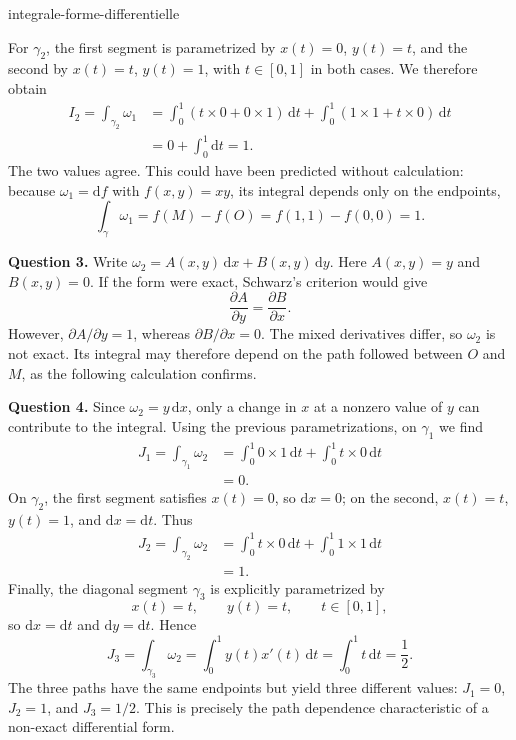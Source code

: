 \begin{exo}{integrale-forme-differentielle}
\begin{solution}
For $\gamma_2$, the first segment is parametrized by $x(t)=0$, $y(t)=t$,
and the second by $x(t)=t$, $y(t)=1$, with $t\in[0,1]$ in both cases.
We therefore obtain
\[
\begin{aligned}
I_2
= \int_{\gamma_2}\omega_1
&= \int_0^1\left(t\times 0+0\times 1\right)\,\mathrm{d}t
 + \int_0^1\left(1\times 1+t\times 0\right)\,\mathrm{d}t \\
&= 0+\int_0^1\mathrm{d}t = 1.
\end{aligned}
\]
The two values agree. This could have been predicted without calculation:
because $\omega_1=\mathrm{d}f$ with $f(x,y)=xy$, its integral depends only on
the endpoints,
\[
\int_\gamma\omega_1=f(M)-f(O)=f(1,1)-f(0,0)=1.
\]

\textbf{Question 3.} Write $\omega_2=A(x,y)\,\mathrm{d}x+B(x,y)\,\mathrm{d}y$.
Here $A(x,y)=y$ and $B(x,y)=0$. If the form were exact, Schwarz's criterion
would give
\[
\frac{\partial A}{\partial y}=\frac{\partial B}{\partial x}.
\]
However, $\partial A/\partial y=1$, whereas $\partial B/\partial x=0$.
The mixed derivatives differ, so $\omega_2$ is not exact. Its integral may
therefore depend on the path followed between $O$ and $M$, as the following
calculation confirms.

\textbf{Question 4.} Since $\omega_2=y\,\mathrm{d}x$, only a change in $x$
at a nonzero value of $y$ can contribute to the integral. Using the previous
parametrizations, on $\gamma_1$ we find
\[
\begin{aligned}
J_1
=\int_{\gamma_1}\omega_2
&=\int_0^1 0\times 1\,\mathrm{d}t
  +\int_0^1 t\times 0\,\mathrm{d}t \\
&=0.
\end{aligned}
\]
On $\gamma_2$, the first segment satisfies $x(t)=0$, so $\mathrm{d}x=0$;
on the second, $x(t)=t$, $y(t)=1$, and $\mathrm{d}x=\mathrm{d}t$. Thus
\[
\begin{aligned}
J_2
=\int_{\gamma_2}\omega_2
&=\int_0^1 t\times 0\,\mathrm{d}t
  +\int_0^1 1\times 1\,\mathrm{d}t \\
&=1.
\end{aligned}
\]
Finally, the diagonal segment $\gamma_3$ is explicitly parametrized by
\[
x(t)=t,\qquad y(t)=t,\qquad t\in[0,1],
\]
so $\mathrm{d}x=\mathrm{d}t$ and $\mathrm{d}y=\mathrm{d}t$. Hence
\[
J_3
=\int_{\gamma_3}\omega_2
=\int_0^1 y(t)x'(t)\,\mathrm{d}t
=\int_0^1 t\,\mathrm{d}t
=\frac12.
\]
The three paths have the same endpoints but yield three different values:
$J_1=0$, $J_2=1$, and $J_3=1/2$. This is precisely the path dependence
characteristic of a non-exact differential form.
\end{solution}
\end{exo}

